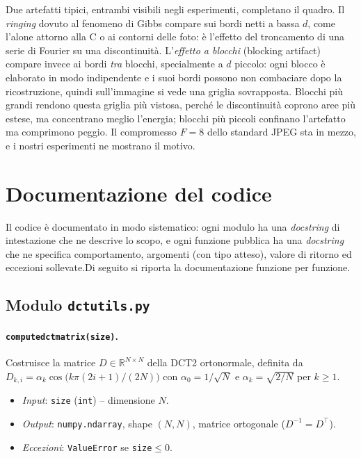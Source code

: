 \documentclass[11pt,a4paper]{article}
\makeatletter
\let\@origtexttt\texttt
\renewcommand{\texttt}[1]{{\def\_{\textunderscore\discretionary{}{}{}}\@origtexttt{#1}}}
\makeatother
\begin{document}
Due artefatti tipici, entrambi visibili negli esperimenti, completano il
quadro. Il \emph{ringing} dovuto al fenomeno di Gibbs compare sui bordi netti a bassa $d$, come
l'alone attorno alla C o ai contorni delle foto: è l'effetto del troncamento
di una serie di Fourier su una discontinuità. L'\emph{effetto a blocchi}
(blocking artifact) compare invece ai bordi \emph{tra} blocchi,
specialmente a $d$ piccolo: ogni blocco è elaborato in modo
indipendente e i suoi bordi possono non combaciare dopo la ricostruzione, quindi
sull'immagine si vede una griglia sovrapposta. Blocchi più grandi rendono
questa griglia più vistosa, perché le discontinuità coprono aree più estese, ma
concentrano meglio l'energia; blocchi più piccoli confinano l'artefatto ma
comprimono peggio. Il compromesso $F=8$ dello standard JPEG sta
in mezzo, e i nostri esperimenti ne mostrano il motivo.

\section{Documentazione del codice}

Il codice è documentato in modo sistematico: ogni modulo ha una \emph{docstring}
di intestazione che ne descrive lo scopo, e ogni funzione pubblica ha una
\emph{docstring} che ne specifica comportamento, argomenti (con tipo atteso),
valore di ritorno ed eccezioni sollevate.Di seguito si riporta la documentazione funzione per funzione.

\subsection{Modulo \texttt{dct\_utils.py}}

\paragraph{\texttt{compute\_dct\_matrix(size)}.}
Costruisce la matrice $D\in\mathbb{R}^{N\times N}$ della DCT2 ortonormale,
definita da $D_{k,i}=\alpha_k\cos\!\bigl(k\pi(2i+1)/(2N)\bigr)$ con
$\alpha_0=1/\sqrt{N}$ e $\alpha_k=\sqrt{2/N}$ per $k\ge 1$.
\begin{itemize}
  \item \emph{Input}: \texttt{size} (\texttt{int}) -- dimensione $N$.
  \item \emph{Output}: \texttt{numpy.ndarray}, shape $(N,N)$, matrice ortogonale
        ($D^{-1}=D^\top$).
  \item \emph{Eccezioni}: \texttt{ValueError} se \texttt{size}$\le 0$.
\end{itemize}
\end{document}
